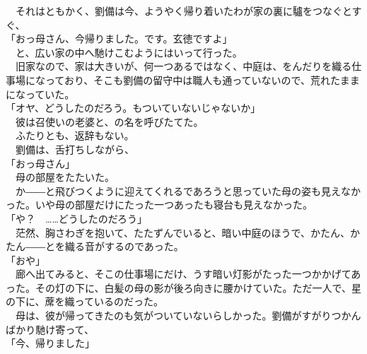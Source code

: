 \documentclass[
  paper=a5,
  fontsize=10pt,
  jafontsize=9.5pt,
  tate,                  %
  open_bracket_pos=nibu, %
]{jlreq}
\begin{document}
　それはともかく、劉備は今、ようやく帰り着いたわが家の裏に驢をつなぐとすぐ、\\


「おっ母さん、今帰りました。です。玄徳ですよ」\\


　と、広い家の中へ馳けこむようにはいって行った。\\


　旧家なので、家は大きいが、何一つあるではなく、中庭は、をんだりを織る仕事場になっており、そこも劉備の留守中は職人も通っていないので、荒れたままになっていた。\\


「オヤ、どうしたのだろう。もついていないじゃないか」\\


　彼は召使いの老婆と、の名を呼びたてた。\\


　ふたりとも、返辞もない。\\


　劉備は、舌打ちしながら、\\


「おっ母さん」\\


　母の部屋をたたいた。\\


　か――と飛びつくように迎えてくれるであろうと思っていた母の姿も見えなかった。いや母の部屋だけにたった一つあったも寝台も見えなかった。\\


「や？　……どうしたのだろう」\\


　茫然、胸さわぎを抱いて、たたずんでいると、暗い中庭のほうで、かたん、かたん――とを織る音がするのであった。\\


「おや」\\


　廊へ出てみると、そこの仕事場にだけ、うす暗い灯影がたった一つかかげてあった。その灯の下に、白髪の母の影が後ろ向きに腰かけていた。ただ一人で、星の下に、蓆を織っているのだった。\\


　母は、彼が帰ってきたのも気がついていないらしかった。劉備がすがりつかんばかり馳け寄って、\\


「今、帰りました」\\
\end{document}
